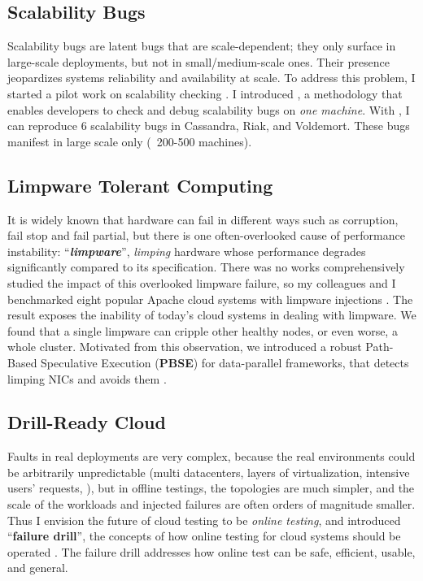 \documentclass[11pt]{article}
\begin{document}
\subsection{Scalability Bugs}

Scalability bugs are latent bugs that are scale-dependent; they only surface in
large-scale deployments, but not in small/medium-scale ones. Their presence
jeopardizes systems reliability and availability at scale. 
%
To address this problem, I started a pilot work on scalability checking
\cite{Gunawi+17-ScaleCheck-Insub}. I introduced \sck, a methodology that enables
developers to check and debug scalability bugs on \textit{one machine}. With
\sck, I can reproduce 6 scalability bugs in Cassandra, Riak, and Voldemort.
These bugs manifest in large scale only (\eg\ 200-500 machines). 

\subsection{Limpware Tolerant Computing}

It is widely known that hardware can fail in different ways such as corruption,
fail stop and fail partial, but there is one often-overlooked cause of
performance instability: ``\textbf{\textit{limpware}}'', \textit{limping}
hardware whose performance degrades significantly compared to its specification.
There was no works comprehensively studied the impact of this overlooked
limpware failure, so my colleagues and I benchmarked eight popular Apache cloud
systems with limpware injections \cite{Do+13-Limplock}. The result exposes the
inability of today's cloud systems in dealing with limpware. We found that a
single limpware can cripple other healthy nodes, or even worse, a whole cluster.
Motivated from this observation, we introduced a robust Path-Based Speculative
Execution (\textbf{PBSE}) for data-parallel frameworks, that detects limping
NICs and avoids them \cite{Suminto+17-PBSE-InSub}.

\subsection{Drill-Ready Cloud} 

Faults in real deployments are very complex, because the real environments could
be arbitrarily unpredictable (multi datacenters, layers of virtualization,
intensive users' requests, \etc), but in offline testings, the topologies are
much simpler, and the scale of the workloads and injected failures are often
orders of magnitude smaller. Thus I envision the future of cloud testing to be
\textit{online testing}, and introduced ``\textbf{failure drill}'', the concepts
of how online testing for cloud systems should be operated
\cite{Leesatapornwongsa+14-Drill-fixed}.  The failure drill addresses how online test
can be safe, efficient, usable, and general.
\end{document}
